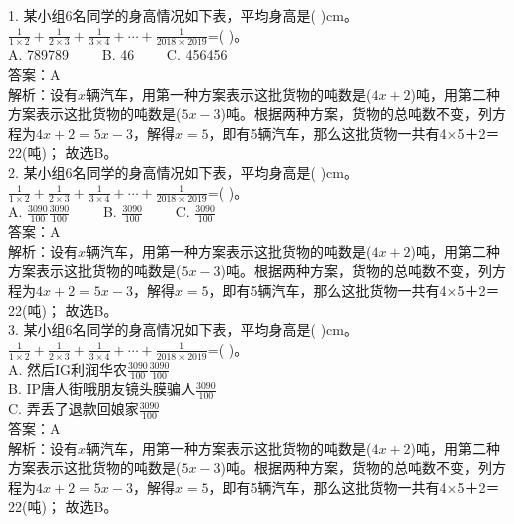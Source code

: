 \documentclass [UTF8]{ctexart}
\begin{document}
1. 某小组6名同学的身高情况如下表，平均身高是( )cm。\( \displaystyle \frac{1}{1\times 2}+\frac{1}{2\times 3}+\frac{1}{3\times 4}+\cdots +\frac{1}{2018\times 2019}\)=( )。\\
A. 789789　　 B. 46　　 C. 456456　　 \\
答案：A\\
解析：设有\( x\)辆汽车，用第一种方案表示这批货物的吨数是(\( 4x+2\))吨，用第二种方案表示这批货物的吨数是(\( 5x-3\))吨。根据两种方案，货物的总吨数不变，列方程为\( 4x+2=5x-3\)，解得\( x=5\)，即有5辆汽车，那么这批货物一共有4×5＋2＝22(吨)； 故选B。\\
2. 某小组6名同学的身高情况如下表，平均身高是( )cm。\( \displaystyle \frac{1}{1\times 2}+\frac{1}{2\times 3}+\frac{1}{3\times 4}+\cdots +\frac{1}{2018\times 2019}\)=( )。\\
A. \( \frac{3090}{100}\)\( \frac{3090}{100}\)　　 B. \( \frac{3090}{100}\)　　 C. \( \frac{3090}{100}\)　　 \\
答案：A\\
解析：设有\( x\)辆汽车，用第一种方案表示这批货物的吨数是(\( 4x+2\))吨，用第二种方案表示这批货物的吨数是(\( 5x-3\))吨。根据两种方案，货物的总吨数不变，列方程为\( 4x+2=5x-3\)，解得\( x=5\)，即有5辆汽车，那么这批货物一共有4×5＋2＝22(吨)； 故选B。\\
3. 某小组6名同学的身高情况如下表，平均身高是( )cm。\( \displaystyle \frac{1}{1\times 2}+\frac{1}{2\times 3}+\frac{1}{3\times 4}+\cdots +\frac{1}{2018\times 2019}\)=( )。\\
A. 然后IG利润华农\( \frac{3090}{100}\)\( \frac{3090}{100}\)　　 \\
B. IP唐人街哦朋友镜头膜骗人\( \frac{3090}{100}\)　　 \\
C. 弄丢了退款回娘家\( \frac{3090}{100}\)　　 \\
答案：A\\
解析：设有\( x\)辆汽车，用第一种方案表示这批货物的吨数是(\( 4x+2\))吨，用第二种方案表示这批货物的吨数是(\( 5x-3\))吨。根据两种方案，货物的总吨数不变，列方程为\( 4x+2=5x-3\)，解得\( x=5\)，即有5辆汽车，那么这批货物一共有4×5＋2＝22(吨)； 故选B。\\
 
\end{document}

